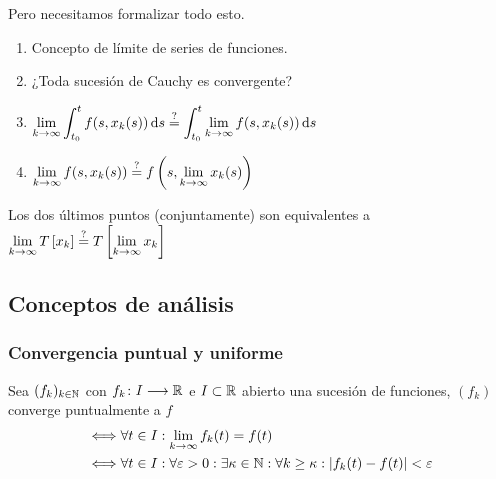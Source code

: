 Pero necesitamos formalizar todo esto.
\begin{enumerate}
	\item Concepto de límite de series de funciones.
	\item ¿Toda sucesión de Cauchy es convergente?
	\item $\ds \lim_{k\to\infty} \int_{t_0}^t f(s, x_k(s)) \odif{s} \stackrel{?}{=} \int_{t_0}^t \lim_{k\to\infty} f(s, x_k(s)) \odif{s}$
	\item $\displaystyle \lim_{k\to\infty} f(s, x_k(s)) \stackrel{?}{=} f\left(s, \lim_{k\to\infty} x_k(s)\right)$
\end{enumerate}
Los dos últimos puntos (conjuntamente) son equivalentes a $\displaystyle \lim_{k\to\infty} T\left[x_k\right] \stackrel{?}{=} T\left[\lim_{k\to\infty} x_k\right]$
\subsection{Conceptos de análisis}
\subsubsection{Convergencia puntual y uniforme}
\begin{defn}
	Sea $(f_k)_{k\in\mathbb{N}}$ con $f_k \colon I \longrightarrow \mathbb{R}$ e $I\subset \mathbb{R}$ abierto una sucesión de funciones, $(f_k)$ converge puntualmente a $f$
	\[\begin{aligned}
			\iff & \forall t\in I : \lim_{k\to\infty} f_k(t) = f(t)                                                                              \\
			\iff & \forall t \in I : \forall \varepsilon > 0 :  \exists \kappa \in \mathbb{N} : \forall k\geq \kappa : \left|f_k(t) - f(t)\right| < \varepsilon
		\end{aligned}\]
\end{defn}

